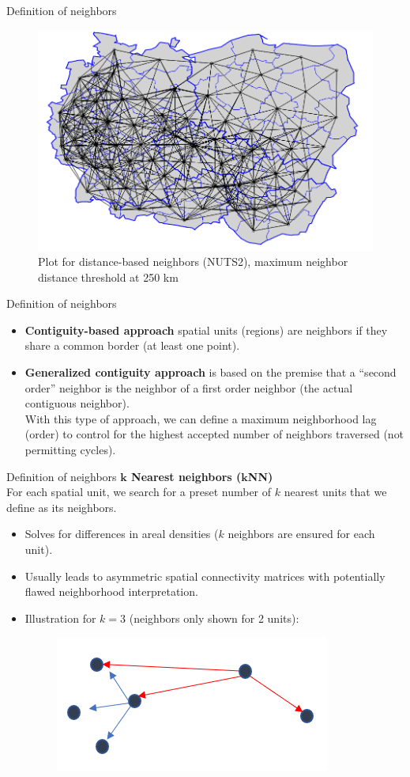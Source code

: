 \documentclass{beamer}
\begin{document}
\begin{frame}{Definition of neighbors}
\begin{figure}
	\includegraphics[width=.7\textwidth]{IMG/sp_neigb.PNG}
	\caption[]{Plot for distance-based neighbors (NUTS2), maximum neighbor distance threshold at 250 km}
\end{figure}
\end{frame}
\begin{frame}{Definition of neighbors}
\begin{itemize}
\item \textbf{Contiguity-based approach} spatial units (regions) are neighbors if they share a common border (at least one point).
\bigskip 
\item \textbf{Generalized contiguity approach} is based on the premise that a ``second order'' neighbor is the neighbor of a first order neighbor (the actual contiguous neighbor). \\ \smallskip With this type of approach, we can define a maximum neighborhood lag (order) to control for the highest accepted number
of neighbors traversed (not permitting cycles).	
\end{itemize}
\end{frame}
\begin{frame}{Definition of neighbors}
\textbf{$\bm{k}$ Nearest neighbors ($\bm{k}$NN)} \\
\medskip
For each spatial unit, we search for a preset number of $k$ nearest units that we define as its neighbors. 
\medskip
\begin{itemize}
	\item Solves for differences in areal densities ($k$ neighbors are ensured for each unit).
	\smallskip
	\item Usually leads to asymmetric spatial connectivity matrices with potentially flawed neighborhood interpretation. 
	\smallskip
	\item Illustration for $k = 3$   (neighbors only shown for 2 units):
	\begin{figure}
		\includegraphics[width=.2\textwidth]{IMG/sp_neigb2.PNG}
	\end{figure}
\end{itemize}
\end{frame}
\end{document}
